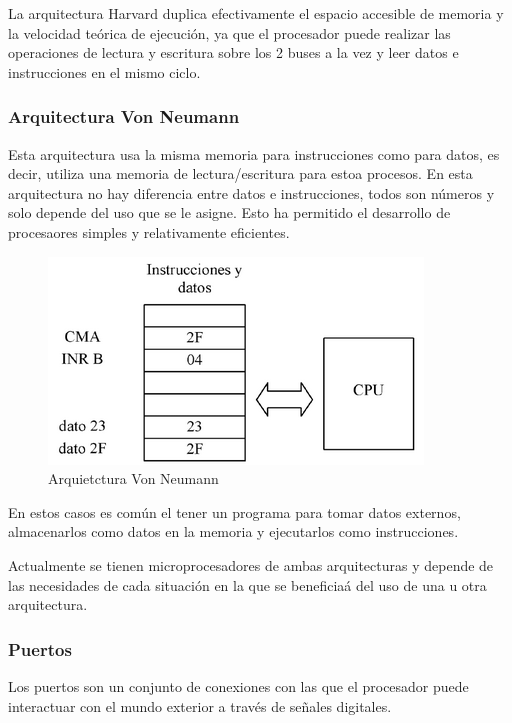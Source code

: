 \documentclass[letterpaper,12pt,oneside]{book}
\begin{document}
				La arquitectura Harvard duplica efectivamente el espacio accesible de memoria y la velocidad teórica de ejecución, ya que el procesador puede realizar las operaciones de lectura y escritura sobre los 2 buses a la vez y leer datos e instrucciones en el mismo ciclo\cite{caprile2012desarrollo}.

				\subsubsection{Arquitectura Von Neumann}
				Esta arquitectura usa la misma memoria para instrucciones como para datos, es decir, utiliza una memoria de lectura/escritura para estoa procesos. En esta arquitectura no hay diferencia entre datos e instrucciones, todos son números y solo depende del uso que se le asigne. Esto ha permitido el desarrollo de procesaores simples y relativamente eficientes.

				\begin{figure}[!htpb]
					\centering
					\includegraphics[scale = 1.0]{Material de Consulta/ArqVNm.PNG}
					\caption[Arquietctura Von Neumann]{Arquietctura Von Neumann}
					\label{ArqVNm}
				\end{figure}

				En estos casos es común el tener un programa para tomar datos externos, almacenarlos como datos en la memoria y ejecutarlos como instrucciones.

				Actualmente se tienen microprocesadores de ambas arquitecturas y depende de las necesidades de cada situación en la que se beneficiaá del uso de una u otra arquitectura.

				\subsubsection{Puertos}
				Los puertos son un conjunto de conexiones con las que el procesador puede interactuar con el mundo exterior a través de señales digitales.
\end{document}
